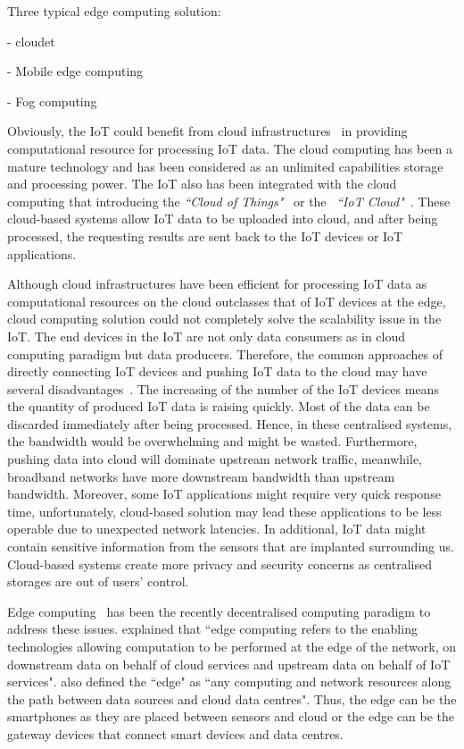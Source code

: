 Three typical edge computing solution:

- cloudet 

- Mobile edge computing

- Fog computing

Obviously, the IoT could benefit from cloud infrastructures~\citep{Botta:2016} in providing computational resource for processing IoT data.
The cloud computing has been a mature technology and has been considered as an unlimited capabilities storage and processing power.
The IoT also has been integrated with the cloud computing that introducing the \textit{``Cloud of Things"}~\citep{Jiehan:2013} or the ~\textit{``IoT Cloud"}~\citep{Truong:2015}.
These cloud-based systems allow IoT data to be uploaded into cloud, and after being processed, the requesting results are sent back to the IoT devices or IoT applications.

Although cloud infrastructures have been efficient for processing IoT data as computational resources on the cloud outclasses that of IoT devices at the edge, cloud computing solution could not completely solve the scalability issue in the IoT.
The end devices in the IoT are not only data consumers as in cloud computing paradigm but data producers.
Therefore, the common approaches of directly connecting IoT devices and pushing IoT data to the cloud may have several disadvantages~\citep{Zhang:2015}.
The increasing of the number of the IoT devices means the quantity of produced IoT data is raising quickly.
Most of the data can be discarded immediately after being processed.
Hence, in these centralised systems, the bandwidth would be overwhelming and might be wasted.
Furthermore, pushing data into cloud will dominate upstream network traffic, meanwhile, broadband networks have more downstream bandwidth than upstream bandwidth.
Moreover, some IoT applications might require very quick response time, unfortunately, cloud-based solution may lead these applications to be less operable due to unexpected network latencies.
In additional, IoT data might contain sensitive information from the sensors that are implanted surrounding us.
Cloud-based systems create more privacy and security concerns as centralised storages are out of users' control.

Edge computing~\citep{Salman:2015} has been the recently decentralised computing paradigm to address these issues.
\cite{WShi:2016} explained that ``edge computing refers to the enabling technologies allowing computation to be performed at the edge of the network,
on downstream data on behalf of cloud services and upstream data on behalf of IoT services".
\cite{WShi:2016} also defined the ``edge" as ``any computing and network resources along the path between data sources and cloud data centres".
Thus, the edge can be the smartphones as they are placed between sensors and cloud or the edge can be the gateway devices that connect smart devices and data centres.

